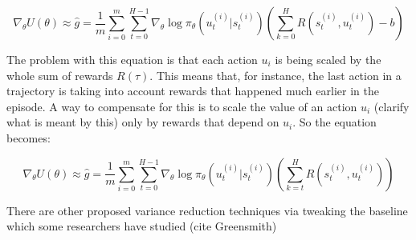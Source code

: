 \documentclass{../main.tex}{subfiles}
\begin{document}
\begin{equation}\label{equation:approximate-gradient-vanilla}
\nabla_{\theta}U(\theta) \approx \hat{g} = \frac{1}{m} \sum_{i = 0}^{m} \sum_{t=0}^{H-1} \nabla_{\theta} \log \pi_{\theta}(u_t^{(i)} | s_t^{(i)}) (\sum_{k=0}^{H}R(s_t^{(i)}, u_t^{(i)}) - b)
\end{equation}

The problem with this equation is that each action $u_i$ is being scaled by the whole sum of rewards $R(\tau)$. This means that, for instance, the last action in a trajectory is taking into account rewards that happened much earlier in the episode. A way to compensate for this is to scale the value of an action $u_i$ (clarify what is meant by this) only by rewards that depend on $u_i$. So the equation becomes:

\begin{equation}
\nabla_{\theta}U(\theta) \approx \hat{g} = \frac{1}{m} \sum_{i = 0}^{m} \sum_{t=0}^{H-1} \nabla_{\theta} \log \pi_{\theta}(u_t^{(i)} | s_t^{(i)}) (\sum_{k=t}^{H}R(s_t^{(i)}, u_t^{(i)}))
\end{equation}

There are other proposed variance reduction techniques via tweaking the baseline which some researchers have studied (cite Greensmith)
\end{document}
